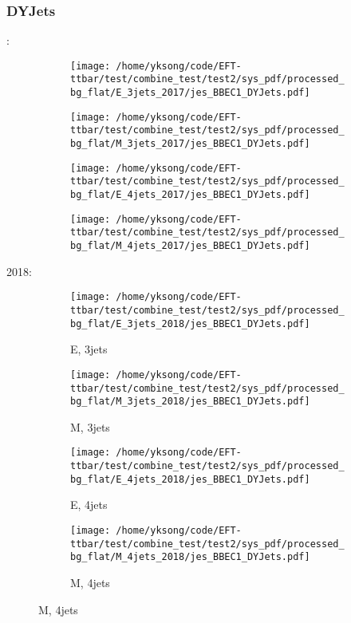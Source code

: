 \documentclass{beamer}
\begin{document}
\begin{frame}
\frametitle{DYJets}
\fontsize{5}{1}:
\begin{figure}
\centering
\begin{subfigure}[b]{0.24\textwidth}
\texttt{[image: /home/yksong/code/EFT-ttbar/test/combine\_test/test2/sys\_pdf/processed\_bg\_flat/E\_3jets\_2017/jes\_BBEC1\_DYJets.pdf]}
\end{subfigure}
\begin{subfigure}[b]{0.24\textwidth}
\texttt{[image: /home/yksong/code/EFT-ttbar/test/combine\_test/test2/sys\_pdf/processed\_bg\_flat/M\_3jets\_2017/jes\_BBEC1\_DYJets.pdf]}
\end{subfigure}
\begin{subfigure}[b]{0.24\textwidth}
\texttt{[image: /home/yksong/code/EFT-ttbar/test/combine\_test/test2/sys\_pdf/processed\_bg\_flat/E\_4jets\_2017/jes\_BBEC1\_DYJets.pdf]}
\end{subfigure}
\begin{subfigure}[b]{0.24\textwidth}
\texttt{[image: /home/yksong/code/EFT-ttbar/test/combine\_test/test2/sys\_pdf/processed\_bg\_flat/M\_4jets\_2017/jes\_BBEC1\_DYJets.pdf]}
\end{subfigure}
\end{figure}
2018:
\begin{figure}
\centering
\begin{subfigure}[b]{0.24\textwidth}
\texttt{[image: /home/yksong/code/EFT-ttbar/test/combine\_test/test2/sys\_pdf/processed\_bg\_flat/E\_3jets\_2018/jes\_BBEC1\_DYJets.pdf]}
\captionsetup{font=tiny}
\caption{E, 3jets}
\end{subfigure}
\begin{subfigure}[b]{0.24\textwidth}
\texttt{[image: /home/yksong/code/EFT-ttbar/test/combine\_test/test2/sys\_pdf/processed\_bg\_flat/M\_3jets\_2018/jes\_BBEC1\_DYJets.pdf]}
\captionsetup{font=tiny}
\caption{M, 3jets}
\end{subfigure}
\begin{subfigure}[b]{0.24\textwidth}
\texttt{[image: /home/yksong/code/EFT-ttbar/test/combine\_test/test2/sys\_pdf/processed\_bg\_flat/E\_4jets\_2018/jes\_BBEC1\_DYJets.pdf]}
\captionsetup{font=tiny}
\caption{E, 4jets}
\end{subfigure}
\begin{subfigure}[b]{0.24\textwidth}
\texttt{[image: /home/yksong/code/EFT-ttbar/test/combine\_test/test2/sys\_pdf/processed\_bg\_flat/M\_4jets\_2018/jes\_BBEC1\_DYJets.pdf]}
\captionsetup{font=tiny}
\caption{M, 4jets}
\end{subfigure}
\end{figure}
\end{frame}
\end{document}
